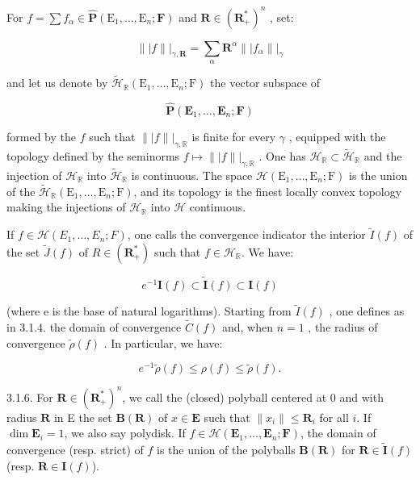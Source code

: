 For \(f = \sum f_{\alpha} \in \hat{\mathbf{P}}(\mathrm{E}_1, \ldots, \mathrm{E}_n; \mathbf{F})\) and \(\mathbf{R} \in (\mathbf{R}_{+}^{*})^n\) , set:

\[
\| | f \| | _ {\gamma , \mathbf {R}} = \sum_ {\alpha} \mathbf {R} ^ {\alpha} \| | f _ {\alpha} \| | _ {\gamma}
\]

and let us denote by \(\tilde{\mathcal{H}}_{\mathbb{R}}(\mathrm{E}_{1},\ldots ,\mathrm{E}_{n};\mathrm{F})\) the vector subspace of

\[
\hat {\mathbf {P}} (\mathbf {E} _ {1}, \dots , \mathbf {E} _ {n}; \mathbf {F})
\]

formed by the \(f\) such that \(\| | f \| | _ {\gamma,\mathbb{R}}\) is finite for every \(\gamma\) , equipped with the topology defined by the seminorms \(f\mapsto\| | f \| | _ {\gamma,\mathbb{R}}\) . One has \(\mathcal{H}_{\mathbb{R}}\subset\tilde{\mathcal{H}}_{\mathbb{R}}\) and the injection of \(\mathcal{H}_{\mathbb{R}}\) into \(\tilde{\mathcal{H}}_{\mathbb{R}}\) is continuous. The space \(\mathcal{H}(\mathrm{E}_{1},\ldots,\mathrm{E}_{n};\mathrm{F})\) is the union of the \(\tilde{\mathcal{H}}_{\mathbb{R}}(\mathrm{E}_{1},\ldots,\mathrm{E}_{n};\mathrm{F})\), and its topology is the finest locally convex topology making the injections of \(\mathcal{H}_{\mathbb{R}}\) into \(\mathcal{H}\) continuous.

If \(f \in \mathcal{H}(E_1, \ldots, E_n; F)\), one calls the convergence indicator the interior \(\tilde{I}(f)\) of the set \(\tilde{J}(f)\) of \(R \in (\mathbf{R}_+^*)\) such that \(f \in \mathcal{H}_{\mathbb{R}}\). We have:

\[
e ^ {- 1} \mathbf {I} (f) \subset \tilde{\mathbf {I}} (f) \subset \mathbf {I} (f)
\]

(where e is the base of natural logarithms). Starting from \(\tilde{I}(f)\) , one defines as in 3.1.4. the domain of convergence \(\tilde{C}(f)\) and, when \(n = 1\) , the radius of convergence \(\tilde{\rho}(f)\) . In particular, we have:

\[
e ^ {- 1} \tilde {\rho} (f) \leqslant \rho (f) \leqslant \tilde {\rho} (f).
\]

3.1.6. For \(\mathbf{R} \in (\mathbf{R}_{+}^{*})^{n}\), we call the (closed) polyball centered at 0 and with radius \(\mathbf{R}\) in E the set \(\mathbf{B}(\mathbf{R})\) of \(x \in \mathbf{E}\) such that \(\|x_{i}\| \leqslant \mathbf{R}_{i}\) for all \(i\). If \(\dim \mathbf{E}_{i} = 1\), we also say polydisk. If \(f \in \mathcal{H}(\mathbf{E}_{1}, \ldots, \mathbf{E}_{n}; \mathbf{F})\), the domain of convergence (resp. strict) of \(f\) is the union of the polyballs \(\mathbf{B}(\mathbf{R})\) for \(\mathbf{R} \in \tilde{\mathbf{I}}(f)\) (resp. \(\mathbf{R} \in \mathbf{I}(f)\)).

